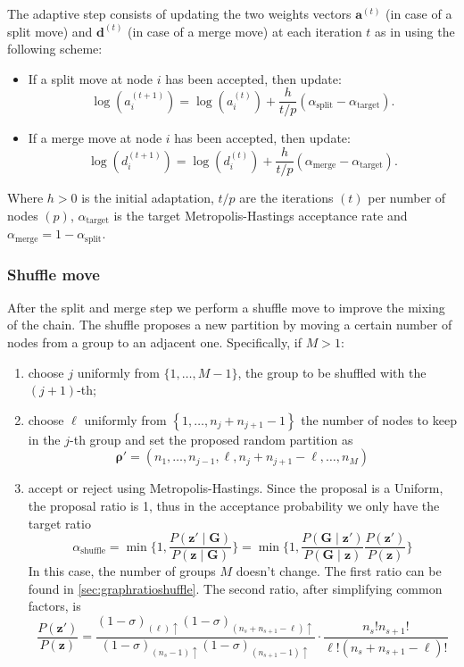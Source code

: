 The adaptive step consists of updating the two weights vectors $\bm{a}^{(t)}$ (in case of a split move) and $\bm{d}^{(t)}$ (in case of a merge move) at each iteration $t$ as in \textcite{bensonAdaptiveMCMCMultiple2018} using the following scheme:
    \begin{itemize}
        \item If a split move at node $i$ has been accepted, then update:
        \[
            \log (a_i^{(t+1)})=\log (a_i^{(t)})+\frac{h}{t/p}(\alpha_{\text{split}}-\alpha_{\text{target}}) .
        \]
        \item If a merge move at node $i$ has been accepted, then update:
        \[
            \log (d_i^{(t+1)})=\log (d_i^{(t)})+\frac{h}{t/p}(\alpha_{\text{merge}}-\alpha_{\text{target}}) .
        \]
    \end{itemize}

Where $h>0$ is the initial adaptation, $t/p$ are the iterations $(t)$ per number of nodes $(p)$, $\alpha_{\text{target}}$ is the target Metropolis-Hastings acceptance rate and $\alpha_{\text{merge}} = 1 - \alpha_{\text{split}}$.


\subsubsection{Shuffle move}

After the split and merge step we perform a shuffle move to improve the mixing of the chain.
The shuffle proposes a new partition by moving a certain number of nodes from a group to an adjacent one.
Specifically, if $M>1$:
\begin{enumerate}
    \item choose $j$ uniformly from $\{1, \ldots, M-1\}$, the group to be shuffled with the $(j+1)$-th;
    \item choose $\ell$ uniformly from $\left\{1, \ldots, n_j+n_{j+1}-1\right\}$ the number of nodes to keep in the $j$-th group and set the proposed random partition as
    \[
        \bm{\rho}'=\left(n_1, \ldots, n_{j-1}, \ell, n_j+n_{j+1}-\ell, \ldots, n_M\right)
    \]
    \item accept or reject using Metropolis-Hastings. Since the proposal is a Uniform, the proposal ratio is 1, thus in the acceptance probability we only have the target ratio
    \[
       \alpha_{\text{shuffle}}
       =
       \min
       \bigg\{1,
       \frac{P(\bm{z}'\mid \bm{G})}{P(\bm{z}\mid \bm{G})}
       \bigg\}
       =
       \min
       \bigg\{1,
       \frac{P(\bm{G}\mid \bm{z}')}{P(\bm{G}\mid \bm{z})}
       \frac{P(\bm{z}')}{P(\bm{z})}
       \bigg\}
    \]
    In this case, the number of groups $M$ doesn't change.
    The first ratio can be found in \ref{sec:graphratioshuffle}.
    The second ratio, after simplifying common factors, is
    \[
        \frac{P(\bm{z}')}{P(\bm{z})} = \frac{(1-\sigma)_{(\ell)\uparrow} (1-\sigma)_{(n_{s}+n_{s+1}-\ell)\uparrow}}{(1-\sigma)_{(n_{s}-1)\uparrow} (1-\sigma)_{(n_{s+1}-1)\uparrow}}
        \cdot \frac{n_{s}! n_{s+1}!}{\ell!(n_{s} + n_{s+1} - \ell)!}
    \]
    
\end{enumerate}

